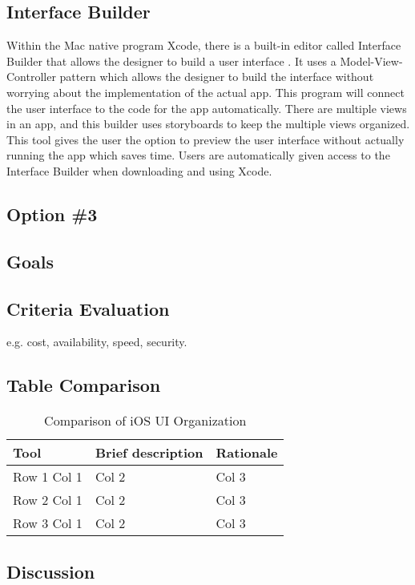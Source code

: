 \documentclass[letterpaper,10pt,draftclsnofoot,onecolumn,titlepage]{IEEEtran}
\begin{document}
	\subsection{Interface Builder}
	Within the Mac native program Xcode, there is a built-in editor called Interface Builder that allows the designer to build a user interface \cite{Interface}.
	It uses a Model-View-Controller pattern which allows the designer to build the interface without worrying about the implementation of the actual app.
	This program will connect the user interface to the code for the app automatically.
	There are multiple views in an app, and this builder uses storyboards to keep the multiple views organized.
	This tool gives the user the option to preview the user interface without actually running the app which saves time.
	Users are automatically given access to the Interface Builder when downloading and using Xcode.
	\subsection{Option \#3}
	\subsection{Goals}
	\subsection{Criteria Evaluation}
	e.g. cost, availability, speed, security.
	\subsection{Table Comparison}
	\begin{table}[ht]
	\caption{Comparison of iOS UI Organization}
	\begin{center}
	\begin{tabular} { | m{3cm} | m{5cm} | m{5cm} | }
	\hline\hline
	Tool & Brief description & Rationale \\ [0.5ex]
	\hline
	Row 1 Col 1 & Col 2 & Col 3 \\
	\hline
	Row 2 Col 1 & Col 2 & Col 3 \\
	\hline
	Row 3 Col 1 & Col 2 & Col 3 \\
	\hline
	\end{tabular}
	\end{center}
	\end{table}
	\subsection{Discussion}
\end{document}

